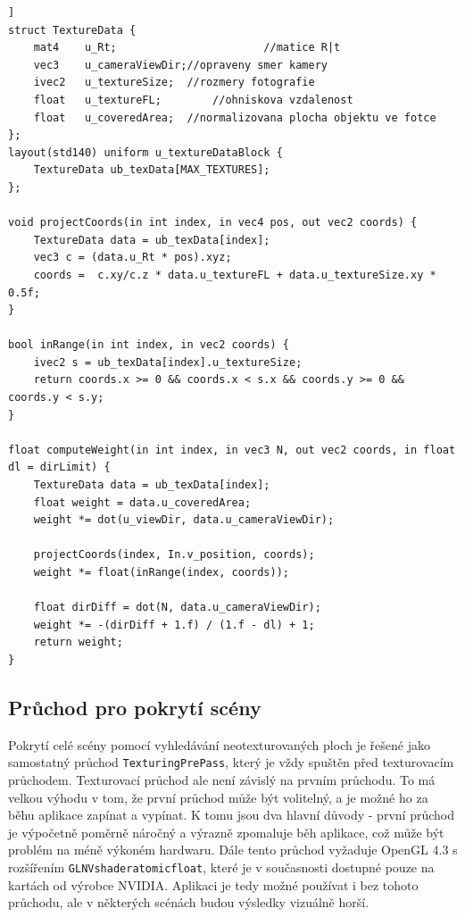 \documentclass[11pt,twoside,a4paper]{book}
\begin{document}
\begin{lstlisting}[caption={Výpočet váhy a projekce souřadnice na fragmentovém shaderu.},label={code:frag-weight},float=[ht]]
struct TextureData {
	mat4	u_Rt;						//matice R|t
	vec3	u_cameraViewDir;//opraveny smer kamery
	ivec2	u_textureSize;	//rozmery fotografie
	float	u_textureFL;		//ohniskova vzdalenost
	float	u_coveredArea;	//normalizovana plocha objektu ve fotce
};
layout(std140) uniform u_textureDataBlock {
	TextureData ub_texData[MAX_TEXTURES];
};

void projectCoords(in int index, in vec4 pos, out vec2 coords) {
	TextureData data = ub_texData[index];
	vec3 c = (data.u_Rt * pos).xyz;
	coords =  c.xy/c.z * data.u_textureFL + data.u_textureSize.xy * 0.5f;
}

bool inRange(in int index, in vec2 coords) {
	ivec2 s = ub_texData[index].u_textureSize;
	return coords.x >= 0 && coords.x < s.x && coords.y >= 0 && coords.y < s.y; 
}

float computeWeight(in int index, in vec3 N, out vec2 coords, in float dl = dirLimit) {
	TextureData data = ub_texData[index];
	float weight = data.u_coveredArea;
	weight *= dot(u_viewDir, data.u_cameraViewDir);

	projectCoords(index, In.v_position, coords);
	weight *= float(inRange(index, coords));

	float dirDiff = dot(N, data.u_cameraViewDir);
	weight *= -(dirDiff + 1.f) / (1.f - dl) + 1;
	return weight;
}
\end{lstlisting}

\subsection{Průchod pro pokrytí scény}

Pokrytí celé scény pomocí vyhledávání neotexturovaných ploch je řešené jako samostatný průchod \texttt{TexturingPrePass}, který je vždy spuštěn před texturovacím průchodem. Texturovací průchod ale není závislý na prvním průchodu. To má velkou výhodu v tom, že první průchod může být volitelný, a je možné ho za běhu aplikace zapínat a vypínat. K tomu jsou dva hlavní důvody - první průchod je výpočetně poměrně náročný a výrazně zpomaluje běh aplikace, což může být problém na méně výkoném hardwaru. Dále tento průchod vyžaduje OpenGL 4.3 s rozšířením \texttt{GL\textunderscore NV\textunderscore shader\textunderscore atomic\textunderscore float}, které je v současnosti dostupné pouze na kartách od výrobce NVIDIA. Aplikaci je tedy možné používat i bez tohoto průchodu, ale v některých scénách budou výsledky vizuálně horší.
\end{document}
